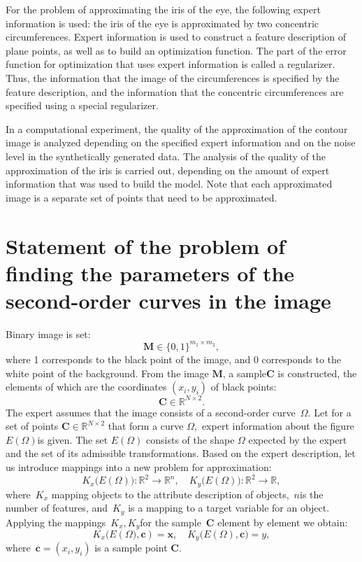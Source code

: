 \documentclass[12pt, twoside]{article}
\numberwithin{equation}{section}
\begin{document}
For the problem of approximating the iris of the eye, the following expert information is used: the iris of the eye is approximated by two concentric circumferences. Expert information is used to construct a feature description of plane points, as well as to build an optimization function. The part of the error function for optimization that uses expert information is called a regularizer. Thus, the information that the image of the circumferences is specified by the feature description, and the information that the concentric circumferences are specified using a special regularizer.

In a computational experiment, the quality of the approximation of the contour image is analyzed depending on the specified expert information and on the noise level in the synthetically generated data. The analysis of the quality of the approximation of the iris is carried out, depending on the amount of expert information that was used to build the model. Note that each approximated image is a separate set of points that need to be approximated.

\section{Statement of the problem of finding the parameters of the second-order curves in the image}
Binary image is set:
$$ \mathbf{M} \in \{0, 1 \}^{m_1\times m_2},$$
where 1 corresponds to the black point of the image, and 0 corresponds to the white point of the background.
From the image $\mathbf {M} $, a sample$ \mathbf{C}$ is constructed, the elements of which are the coordinates $(x_i, y_i)$ of black points: $$\mathbf {C} \in \mathbb {R}^{N \times 2}. $$
The expert assumes that the image consists of a second-order curve~$\Omega$.
Let for a set of points $\mathbf {C} \in \mathbb {R}^{N \times 2} $ that form a curve $\Omega, $ expert information about the figure $E(\Omega) $is given.
The set $E (\Omega)$ consists of the shape $\Omega$ expected by the expert and the set of its admissible transformations. Based on the expert description, let us introduce mappings into a new problem for approximation:
\begin{equation}\label{eq1}
	K_{x}\bigl(E(\Omega)\bigr): \mathbb{R}^{2} \rightarrow \mathbb{R}^{n}, \quad K_{y}\bigl(E(\Omega)\bigr): \mathbb{R}^{2} \rightarrow \mathbb{R},
\end{equation} 
where~$K_{x}$ mapping objects to the attribute description of objects,~$n$is the number of features, and~$K_ {y}$ is a mapping to a target variable for an object. Applying the mappings~$K_ {x}, K_{y}$for the sample~$\mathbf {C}$ element by element we obtain:
\begin{equation}
\label{eq2}
	K_{x}\bigl(E(\Omega\bigr), \mathbf{c}) = \mathbf{x}, \quad  K_{y}\bigl(E(\Omega), \mathbf{c}\bigr) = y,
\end{equation}
where~$\mathbf{c} = (x_i, y_i)$ is a sample point $\mathbf{C}$.
\end{document}
